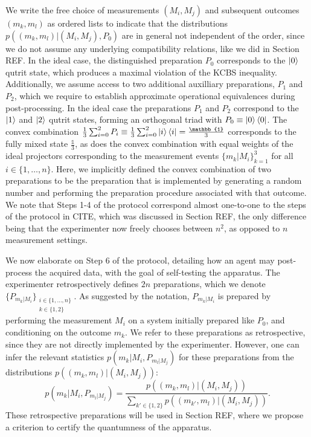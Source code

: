 We write the free choice of measurements $(M_i,M_j)$ and subsequent outcomes $(m_k,m_l)$ as ordered lists to indicate that the distributions $p((m_k,m_l)\vert (M_i,M_j),P_0)$ are in general not independent of the order, since we do not assume any underlying compatibility relations, like we did in Section REF. In the ideal case, the distinguished preparation $P_0$ corresponds to the $\ket{0}$ qutrit state, which produces a maximal violation of the KCBS inequality. Additionally, we assume access to two additional auxilliary preparations, $P_1$ and $P_2$, which we require to establish approximate operational equivalences during post-processing. In the ideal case the preparations $P_1$ and $P_2$ correspond to the $\ket{1}$ and $\ket{2}$ qutrit states, forming an orthogonal triad with $P_0\equiv\ket{0}\bra{0}$. The convex combination $\frac{1}{3}\sum_{i=0}^2 P_i\equiv\frac{1}{3}\sum_{i=0}^2\ket{i}\bra{i}=\frac{\mathbb{1}}{3}$ corresponds to the fully mixed state $\frac{\mathbb{1}}{3}$, as does the convex combination with equal weights of the ideal projectors corresponding to the measurement events $\{m_k\vert M_i\}_{k=1}^3$ for all $i\in\{1,\dots,n\}$. Here, we implicitly defined the convex combination of two preparations to be the preparation that is implemented by generating a random number and performing the preparation procedure associated with that outcome. We note that Steps 1-4 of the protocol correspond almost one-to-one to the steps of the protocol in CITE, which was discussed in Section REF, the only difference being that the experimenter now freely chooses between $n^2$, as opposed to $n$ measurement settings.

We now elaborate on Step 6 of the protocol, detailing how an agent may post-process the acquired data, with the goal of self-testing the apparatus. The experimenter retrospectively defines $2n$ preparations, which we denote $\{P_{m_k\vert M_i}\}_{\substack{i\in\{1,\dots,n\} \\ k\in\{1,2\}}}$. As suggested by the notation, $P_{m_k\vert M_i}$ is prepared by performing the measurement $M_i$ on a system initially prepared like $P_0$, and conditioning on the outcome $m_k$. We refer to these preparations as retrospective, since they are not directly implemented by the experimenter. However, one can infer the relevant statistics $p(m_k\vert M_i, P_{m_l\vert M_j})$ for these preparations from the distributions $p((m_k,m_l)\vert (M_i,M_j))$:
\begin{equation}
p(m_k\vert M_i, P_{m_l\vert M_j})=\frac{p((m_k,m_l)\vert (M_i,M_j))}{\sum_{k'\in\{1,2\}} p((m_{k'},m_l)\vert (M_i,M_j))}.
\end{equation}
These retrospective preparations will be used in Section REF, where we propose a criterion to certify the quantumness of the apparatus.

